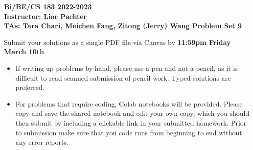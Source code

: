 \documentclass[11pt]{exam}
\begin{document}
\begin{center}

     \textbf{Bi/BE/CS 183 2022-2023\\ Instructor: Lior Pachter\\ TAs: Tara Chari, Meichen Fang, Zitong (Jerry) Wang \vskip 0.15in Problem Set 9}

\end{center}




Submit your solutions as a single PDF file via Canvas by {\bf 11:59pm Friday March 10th}. 
\begin{itemize}
  \item If writing up problems by hand, please use a pen and not a pencil, as it is difficult to read scanned submission of pencil work. Typed solutions are preferred.
  \item For problems that require coding, Colab notebooks will be provided. Please copy and save the shared notebook and edit your own copy, which you should then submit by including a clickable link in your submitted homework. Prior to submission make sure that you code runs from beginning to end without any error reports.


\end{itemize}
\end{document}
